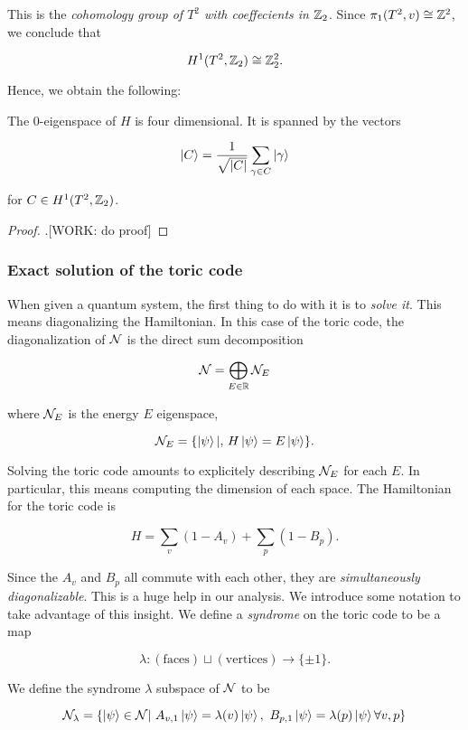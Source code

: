 This is the \textit{cohomology group of $T^2$ with coeffecients in $\mathbb{Z}_2$}. Since $\pi_1(T^2,v)\cong \mathbb{Z}^2$, we conclude that

$$H^1(T^2,\mathbb{Z}_2)\cong \mathbb{Z}_2^2.$$

Hence, we obtain the following:

\begin{proposition} The $0$-eigenspace of $H$ is four dimensional. It is spanned by the vectors

$$\ket{C}=\frac{1}{\sqrt{|C|}}\sum_{\gamma\in C}\ket{\gamma}$$

for $C\in H^1(T^2,\mathbb{Z}_2)$.
\end{proposition}
\begin{proof}.[WORK: do proof]
\end{proof}

\subsubsection{Exact solution of the toric code}

When given a quantum system, the first thing to do with it is to \textit{solve it}. This means diagonalizing the Hamiltonian. In this case of the toric code, the diagonalization of $\mathcal{N}$ is the direct sum decomposition

$$\mathcal{N} = \bigoplus_{E\in \mathbb{R}}\mathcal{N}_{E}$$

where $\mathcal{N}_{E}$ is the energy $E$ eigenspace,

$$\mathcal{N}_{E}=\{\ket{\psi} | ,\, H\ket{\psi}= E \ket{\psi}\}.$$

Solving the toric code amounts to explicitely describing $\mathcal{N}_E$ for each $E$. In particular, this means computing the dimension of each space. The Hamiltonian for the toric code is 

$$H=\sum_{v}(1-A_v)+\sum_{p}(1-B_p).$$

Since the $A_v$ and $B_p$ all commute with each other, they are \textit{simultaneously diagonalizable}. This is a huge help in our analysis. We introduce some notation to take advantage of this insight. We define a \textit{syndrome} on the toric code to be a map

$$\lambda: (\text{faces})\sqcup (\text{vertices})\xrightarrow{}\{\pm 1\}.$$

We define the syndrome $\lambda$ subspace of $\mathcal{N}$ to be

$$\mathcal{N}_{\lambda}=\{\ket{\psi}\in \mathcal{N} | \,\, A_{v,1}\ket{\psi}=\lambda(v)\ket{\psi},\,\, B_{p,1}\ket{\psi}=\lambda(p)\ket{\psi}    \forall v,p\}$$

